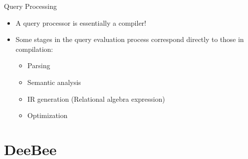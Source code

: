 \documentclass{beamer}
\begin{document}
\begin{frame}{Query Processing}
  \begin{itemize}
    \item A query processor is essentially a compiler!  \pause
    \item Some stages in the query evaluation process correspond directly to those in compilation: \pause
    \begin{itemize}
      \item Parsing \pause
      \item Semantic analysis \pause
      \item IR generation (Relational algebra expression)  \pause
      \item Optimization  \pause
    \end{itemize}
  \end{itemize}
\end{frame}



\section{DeeBee}
\end{document}
